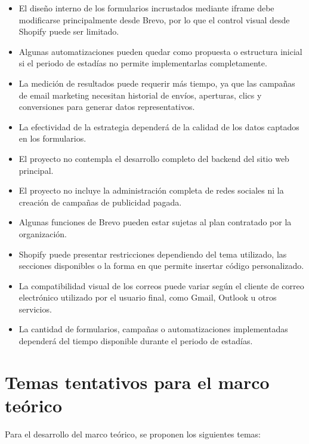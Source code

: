 \begin{itemize}
    \item El diseño interno de los formularios incrustados mediante iframe debe modificarse principalmente desde Brevo, por lo que el control visual desde Shopify puede ser limitado.
    \item Algunas automatizaciones pueden quedar como propuesta o estructura inicial si el periodo de estadías no permite implementarlas completamente.
    \item La medición de resultados puede requerir más tiempo, ya que las campañas de email marketing necesitan historial de envíos, aperturas, clics y conversiones para generar datos representativos.
    \item La efectividad de la estrategia dependerá de la calidad de los datos captados en los formularios.
    \item El proyecto no contempla el desarrollo completo del backend del sitio web principal.
    \item El proyecto no incluye la administración completa de redes sociales ni la creación de campañas de publicidad pagada.
    \item Algunas funciones de Brevo pueden estar sujetas al plan contratado por la organización.
    \item Shopify puede presentar restricciones dependiendo del tema utilizado, las secciones disponibles o la forma en que permite insertar código personalizado.
    \item La compatibilidad visual de los correos puede variar según el cliente de correo electrónico utilizado por el usuario final, como Gmail, Outlook u otros servicios.
    \item La cantidad de formularios, campañas o automatizaciones implementadas dependerá del tiempo disponible durante el periodo de estadías.
\end{itemize}

\section{Temas tentativos para el marco teórico}

Para el desarrollo del marco teórico, se proponen los siguientes temas:

